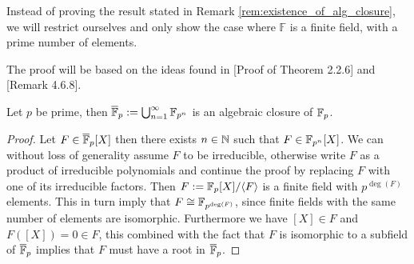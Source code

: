 Instead of proving the  result stated in Remark \ref{rem:existence_of_alg_closure}, we will restrict ourselves and only show the case where $\mathbb{F}$ is a finite field, with a prime number of elements.

The proof will be based on the ideas found in \cite{Galois_theory}[Proof of Theorem 2.2.6] and \cite{alg_lauritzen}[Remark 4.6.8].
\begin{theorem}\label{prop:algebraic_closure_of_finite_field}
   Let $p$ be prime, then $\overline{\mathbb{F}}_{p} := \bigcup_{n = 1}^{\infty} \mathbb{F}_{p^{n}}$ is an algebraic closure of $\mathbb{F}_p$.
 \end{theorem}
 \begin{proof}
   Let $F \in \overline{\mathbb{F}}_{p}[X]$ then there exists $n \in \mathbb{N}$ such that $F \in \mathbb{F}_{p^{n}}[X]$.
   We can without loss of generality assume $F$ to be irreducible, otherwise write $F$ as a product of irreducible polynomials and continue the proof by replacing $F$ with one of its irreducible factors. Then $F := \mathbb{F}_{p}[X] / \langle F\rangle$ is a finite field with $p^{\deg(F)}$ elements. This in turn imply that $F \cong \mathbb{F}_{p^{\deg(F)}}$, since finite fields with the same number of elements are isomorphic. Furthermore we have $[X] \in F$ and $F([X]) = 0 \in F$, this combined with the fact that $F$ is isomorphic to a subfield of $\overline{\mathbb{F}}_{p}$ implies that $F$ must have a root in $\overline{\mathbb{F}}_{p}$.
 \end{proof}
